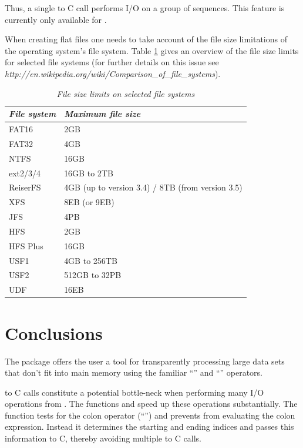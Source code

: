 \documentclass[12pt,a4paper]{article}
\begin{document}
Thus, a single \R{} to C call performs I/O on a group of sequences. 
This feature is currently only available for .

When creating flat files one needs to take account of the file size limitations of the operating system's file system. 
Table \ref{fsl} gives an overview of the file size limits for selected file systems (for further details on this issue see \textit{http://en.wikipedia.org/wiki/Comparison\_of\_file\_systems}).

\begin{table}[htb]
\begin{center}
\caption{\textsl{File size limits on selected file systems}}
\label{fsl}
\begin{tabular}{ll}
  \hline\hline \textsl{File system}\hspace{3ex} & \textsl{Maximum file size} \\
  \hline
  FAT16    & 2GB \\
  FAT32    & 4GB \\
  NTFS     & 16GB \\ \hline
  ext2/3/4 & 16GB to 2TB \\
  ReiserFS & 4GB (up to version 3.4) / 8TB (from version 3.5) \\
  XFS      & 8EB (or 9EB) \\
  JFS      & 4PB \\ \hline
  HFS      & 2GB \\
  HFS Plus & 16GB \\ \hline
  USF1     & 4GB to 256TB \\
  USF2     & 512GB to 32PB \\ \hline
  UDF      & 16EB \\
\hline\hline
\end{tabular}
\end{center}
\end{table}



\section{Conclusions}

The  package offers the \R{} user a tool for transparently processing large data sets that don't fit into main memory using the familiar ``\rc{[\,]}'' and ``\rc{[\,]<-}'' operators. 

\R{} to C calls constitute a potential bottle-neck when performing many I/O operations from \R{}. 
The functions  and  speed up these operations substantially. 
The function  tests for the colon operator (``\rc{:}'') and prevents \R{} from evaluating the colon expression. 
Instead it determines the starting and ending indices and passes this information to C, thereby avoiding multiple \R{} to C calls.
\end{document}
